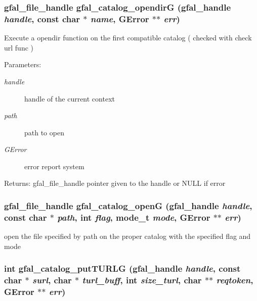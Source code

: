 \subsubsection{\setlength{\rightskip}{0pt plus 5cm}gfal\_\-file\_\-handle gfal\_\-catalog\_\-opendir\-G (gfal\_\-handle {\em handle}, const char $\ast$ {\em name}, GError $\ast$$\ast$ {\em err})}\label{gfal__common__catalog_8h_eb89b1d37a16ef8ecb50ac603366285c}


Execute a opendir function on the first compatible catalog ( checked with check url func ) \begin{Desc}
\item[Parameters:]
\begin{description}
\item[{\em handle}]handle of the current context \item[{\em path}]path to open \item[{\em GError}]error report system \end{description}
\end{Desc}
\begin{Desc}
\item[Returns:]gfal\_\-file\_\-handle pointer given to the handle or NULL if error \end{Desc}
\subsubsection{\setlength{\rightskip}{0pt plus 5cm}gfal\_\-file\_\-handle gfal\_\-catalog\_\-open\-G (gfal\_\-handle {\em handle}, const char $\ast$ {\em path}, int {\em flag}, mode\_\-t {\em mode}, GError $\ast$$\ast$ {\em err})}\label{gfal__common__catalog_8h_cd4cabbd5effdf20bc0b20345c5cc4ab}


open the file specified by path on the proper catalog with the specified flag and mode 
\subsubsection{\setlength{\rightskip}{0pt plus 5cm}int gfal\_\-catalog\_\-put\-TURLG (gfal\_\-handle {\em handle}, const char $\ast$ {\em surl}, char $\ast$ {\em turl\_\-buff}, int {\em size\_\-turl}, char $\ast$$\ast$ {\em reqtoken}, GError $\ast$$\ast$ {\em err})}\label{gfal__common__catalog_8h_63abbdba7f909e0c2e68f72dd5ea9a0c}



